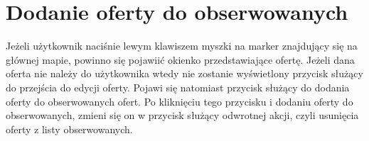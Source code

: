 \section{Dodanie oferty do obserwowanych}
Jeżeli użytkownik naciśnie lewym klawiszem myszki na marker znajdujący się na głównej mapie, powinno się pojawiić okienko przedstawiające ofertę. Jeżeli dana oferta nie należy do użytkownika wtedy nie zostanie wyświetlony przycisk służący do przejścia do edycji oferty. Pojawi się natomiast przycisk służący do dodania oferty do obserwowanych ofert. Po kliknięciu tego przycisku i dodaniu oferty do obserwowanych, zmieni się on w przycisk służący odwrotnej akcji, czyli usunięcia oferty z listy obserwowanych.\\
\\
\begin{minipage}{\linewidth}
\label{watch-offer}
\end{minipage}\\ 
